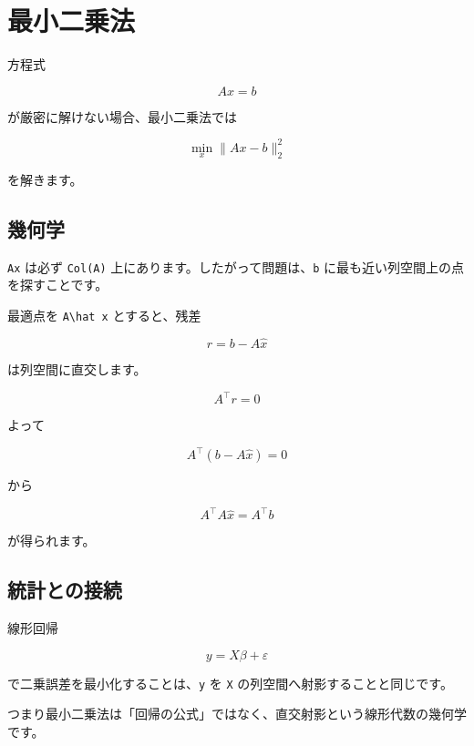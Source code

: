 \documentclass[
  11pt,
  a4paper,
]{ltjsarticle}
\author{}
\date{}
\begin{document}
\hypertarget{ux6700ux5c0fux4e8cux4e57ux6cd5}{%
\section{最小二乗法}\label{ux6700ux5c0fux4e8cux4e57ux6cd5}}

方程式

\[
Ax=b
\]

が厳密に解けない場合、最小二乗法では

\[
\boxed{\min_x\|Ax-b\|_2^2}
\]

を解きます。

\hypertarget{ux5e7eux4f55ux5b66}{%
\subsection{幾何学}\label{ux5e7eux4f55ux5b66}}

\texttt{Ax} は必ず \texttt{Col(A)}
上にあります。したがって問題は、\texttt{b}
に最も近い列空間上の点を探すことです。

最適点を \texttt{A\textbackslash{}hat\ x} とすると、残差

\[
r=b-A\hat x
\]

は列空間に直交します。

\[
A^\top r=0
\]

よって

\[
A^\top(b-A\hat x)=0
\]

から

\[
A^\top A\hat x=A^\top b
\]

が得られます。

\hypertarget{ux7d71ux8a08ux3068ux306eux63a5ux7d9a}{%
\subsection{統計との接続}\label{ux7d71ux8a08ux3068ux306eux63a5ux7d9a}}

線形回帰

\[
y=X\beta+\varepsilon
\]

で二乗誤差を最小化することは、\texttt{y} を \texttt{X}
の列空間へ射影することと同じです。

つまり最小二乗法は「回帰の公式」ではなく、直交射影という線形代数の幾何学です。
\end{document}
